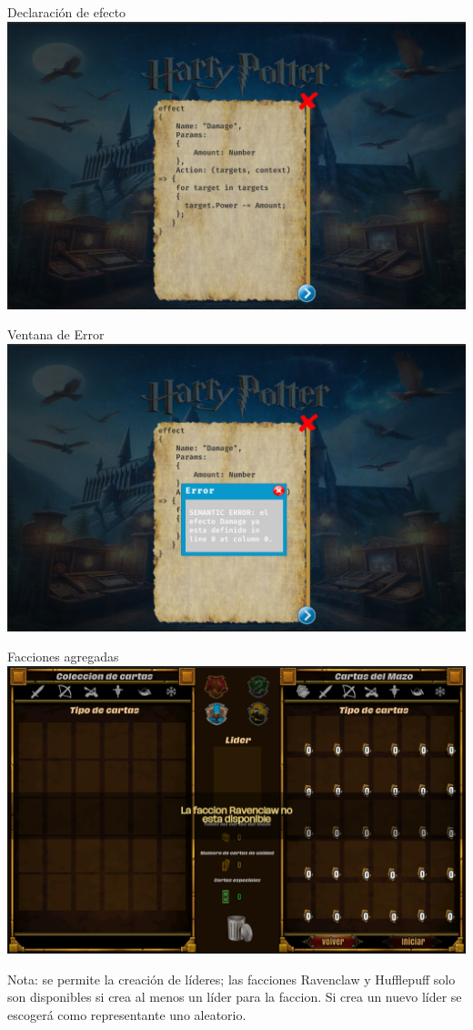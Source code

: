 \documentclass[a4paper, 12pt]{beamer}
\begin{document}
\begin{frame}{\textcolor{plata}{Declaración de efecto}}
\includegraphics[scale = 0.2]{images/image12.png}
\end{frame}

\begin{frame}{\textcolor{plata}{Ventana de Error}}
\includegraphics[scale = 0.2]{images/image13.png}
\end{frame}

\begin{frame}{\textcolor{plata}{Facciones agregadas}}
\includegraphics[scale = 0.2]{images/image14.png}\\
\begin{tiny}
Nota: se permite la creación de líderes; las facciones Ravenclaw y Hufflepuff solo son disponibles si crea al menos un líder para la faccion. Si crea un nuevo líder se escogerá como representante uno aleatorio.
\end{tiny} 
\end{frame}
\end{document}
